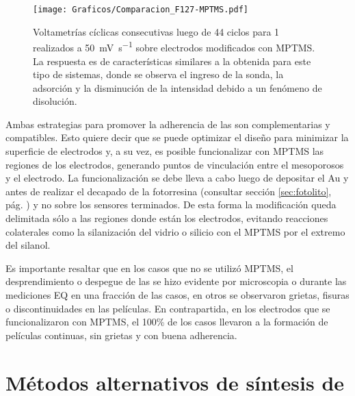 					\begin{figure}[!ht]
							\begin{center}
				 	   	    \texttt{[image: Graficos/Comparacion\_F127-MPTMS.pdf]}
				       		\caption[Comparación de superficies con y sin MPTMS.]{Voltametrías cíclicas consecutivas luego de 44 ciclos para \aminorutenio\space \SI{1}{\milli\Molar} realizados a \SI{50}{\milli\volt.\second^{-1}} sobre electrodos modificados con MPTMS. La respuesta es de características similares a la obtenida para este tipo de sistemas, donde se observa el ingreso de la sonda, la adsorción y la disminución de la intensidad debido a un fenómeno de disolución.}
						 \label{fig:comparaciones_MPTMS-B}	
					    \end{center}
					    \end{figure}
			
			 \pagebreak

			 Ambas estrategias para promover la adherencia de las \pdm\space son complementarias y compatibles. Esto quiere decir que se puede optimizar el diseño para minimizar la superficie de electrodos y, a su vez, es posible funcionalizar  con MPTMS las regiones de los electrodos, generando puntos de vinculación entre el mesoporosos y el electrodo. La funcionalización se debe lleva a cabo luego de depositar el Au y antes de realizar el decapado de la fotorresina (consultar sección \ref{sec:fotolito}, pág. \pageref{sec:fotolito}) y no sobre los sensores terminados. De esta forma la modificación queda delimitada sólo a las regiones donde están los electrodos, evitando reacciones colaterales como la silanización del vidrio o silicio con el MPTMS por el extremo del silanol.

			 Es importante resaltar que en los casos que no se utilizó MPTMS, el desprendimiento o despegue de las \pdm\space se hizo evidente por microscopia o durante las mediciones EQ en una fracción de las casos, en otros se observaron grietas, fisuras o discontinuidades en las películas. En contrapartida, en los electrodos que se funcionalizaron con MPTMS, el 100\% de los casos llevaron a la formación de películas continuas, sin grietas y con buena adherencia.

\section{Métodos alternativos de síntesis de \pdm}
	
